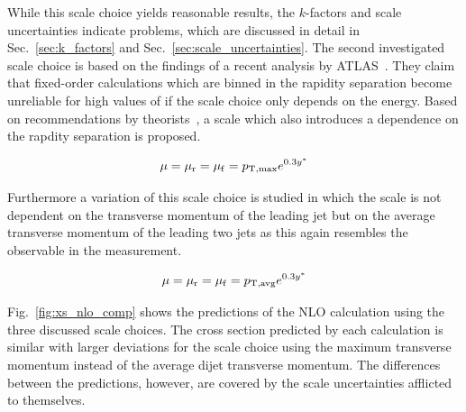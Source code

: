 While this scale choice yields reasonable results, the $k$-factors and scale
uncertainties indicate problems, which are discussed in detail
in Sec.~\ref{sec:k_factors} and Sec.~\ref{sec:scale_uncertainties}. The second investigated scale choice is based on the
findings of a recent analysis by ATLAS~\cite{Aad:2011fc}. They claim that
fixed-order calculations which are binned in the rapidity separation \ystar
become  unreliable for high values of
\ystar if the scale choice only depends on the energy. Based on recommendations
by theorists~\cite{Ellis:1992en}, a scale which also introduces a dependence on
the rapdity separation is proposed.

\begin{equation*}
    \mu = \mu_{\mathrm{r}} = \mu_{\mathrm{f}} = p_{\mathrm{T,max}} e^{0.3 y^*} 
\end{equation*}

Furthermore a variation of this scale choice is studied in which the scale is not
dependent on the transverse momentum of the leading jet but on the average
transverse momentum of the leading two jets as this again resembles the
observable in the measurement.

\begin{equation*}
    \mu = \mu_{\mathrm{r}} = \mu_{\mathrm{f}} = p_{\mathrm{T,avg}} e^{0.3 y^*} 
\end{equation*}

Fig.~\ref{fig:xs_nlo_comp} shows the predictions of the NLO calculation using
the three discussed scale choices. The cross section predicted by each
calculation is similar with larger deviations for the scale choice using the
maximum transverse momentum instead of the average dijet transverse momentum.
The differences between the predictions, however, are covered by the scale
uncertainties afflicted to themselves.

